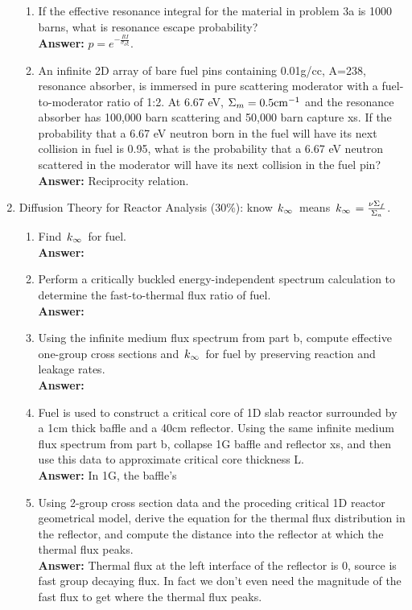 \documentclass{school-22.211-notes}
\begin{document}
\begin{enumerate}
\begin{enumerate}
   \item If the effective resonance integral for the material in problem 3a is 1000 barns, what is resonance escape probability? \\
    \textbf{Answer:} $\displaystyle p = e^{-\frac{RI}{\sigma_d \xi}}$. 

  \item  An infinite 2D array of bare fuel pins containing 0.01g/cc, A=238, resonance absorber, is immersed in pure scattering moderator with a fuel-to-moderator ratio of 1:2. At 6.67 eV, $\Sigma_m = 0.5 \mathrm{cm}^{-1}$ and the resonance absorber has 100,000 barn scattering and 50,000 barn capture xs. If the probability that a 6.67 eV neutron born in the fuel will have its next collision in fuel is 0.95, what is the probability that a 6.67 eV neutron scattered in the moderator will have its next collision in the fuel pin? \\
    \textbf{Answer:} Reciprocity relation. 
  \end{enumerate}

\item Diffusion Theory for Reactor Analysis (30\%): know $\left. k_{\infty} \right.$ means $\left. k_{\infty} \right. = \frac{\nu \Sigma_f}{\Sigma_a}$. 
  \begin{enumerate}
  \item Find $\left. k_{\infty} \right.$ for fuel. \\
    \textbf{Answer:} 

  \item Perform a critically buckled energy-independent spectrum calculation to determine the fast-to-thermal flux ratio of fuel. \\
    \textbf{Answer:} 

  \item Using the infinite medium flux spectrum from part b, compute effective one-group cross sections and $\left. k_{\infty} \right.$ for fuel by preserving reaction and leakage rates. \\
    \textbf{Answer:} 

  \item Fuel is used to construct a critical core of 1D slab reactor surrounded by a 1cm thick baffle and a 40cm reflector. Using the same infinite medium flux spectrum from part b, collapse 1G baffle and reflector xs, and then use this data to approximate critical core thickness L. \\
    \textbf{Answer:} In 1G, the baffle's 

  \item Using 2-group cross section data and the proceding critical 1D reactor geometrical model, derive the equation for the thermal flux distribution in the reflector, and compute the distance into the reflector at which the thermal flux peaks. \\
    \textbf{Answer:} Thermal flux at the left interface of the reflector is 0, source is fast group decaying flux. In fact we don't even need the magnitude of the fast flux to get where the thermal flux peaks. 
  \end{enumerate}


\end{enumerate}
\end{document}
